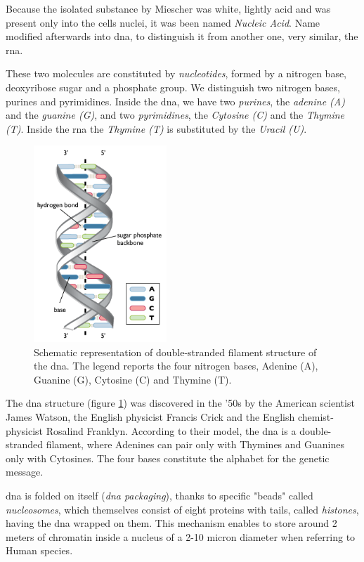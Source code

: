 Because the isolated substance by Miescher was white, lightly acid and was present only into the cells nuclei, it was been named \textit{Nucleic Acid}.
Name modified afterwards into \gls{dna}, to distinguish it from another one, very similar, the \gls{rna}.

These two molecules are constituted by \textit{nucleotides}, formed by a nitrogen base, deoxyribose sugar and a phosphate group.
We distinguish two nitrogen bases, purines and pyrimidines.
Inside the \gls{dna}, we have two \textit{purines}, the \textit{adenine (A)} and the \textit{guanine (G)}, and two \textit{pyrimidines}, the \textit{Cytosine (C)} and the \textit{Thymine (T)}.
Inside the \gls{rna} the \textit{Thymine (T)} is substituted by the \textit{Uracil (U)}.

\begin{figure}[h]
\centering
\includegraphics[width=5cm, keepaspectratio]{img/intro/dna1.png}
\caption[the \gls{dna}]{Schematic representation of double-stranded filament structure of the \gls{dna}. The legend reports the four nitrogen bases, Adenine (A), Guanine (G), Cytosine (C) and Thymine (T).}
\label{fig:dna}
\end{figure}

The \gls{dna} structure (figure \ref{fig:dna}) was discovered in the '50s by the American scientist James Watson, the English physicist Francis Crick and the English chemist-physicist Rosalind Franklyn.
According to their model, the \gls{dna} is a double-stranded filament, where Adenines can pair only with Thymines and Guanines only with Cytosines.
The four bases constitute the alphabet for the genetic message.

\gls{dna} is folded on itself (\textit{\gls{dna} packaging}), thanks to specific "beads" called \textit{nucleosomes}, which themselves consist of eight proteins with tails, called \textit{histones}, having the \gls{dna} wrapped on them.
This mechanism enables to store around 2 meters of chromatin inside a nucleus of a 2-10 micron diameter when referring to Human species.

